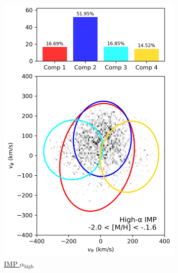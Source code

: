 \documentclass[a4paper,10pt]{article}
\begin{document}
\begin{multicols}{2}
\begin{figure}[H]
\begin{subfigure}[t]{0.24\linewidth}
    \label{fig:vmp_hi}
  \end{subfigure}\hfill
  \begin{subfigure}[t]{0.24\linewidth}
    \includegraphics[width=\linewidth]{../figures/gmm_imp_high_alpha_k4.png}
    \caption{\href{https://raw.githack.com/raunaq-rai/Disentangling-the-Milky-Way-using-GMM/main/figures/IMP\_high\_\_\_-2\%5BM\_H\%5D-1.6.html}{IMP $\alpha_{\mathrm{high}}$}}
    \label{fig:imp_hi}
  \end{subfigure}\hfill
  \begin{subfigure}[t]{0.24\linewidth}

\end{subfigure}
\end{figure}
\end{multicols}
\end{document}
